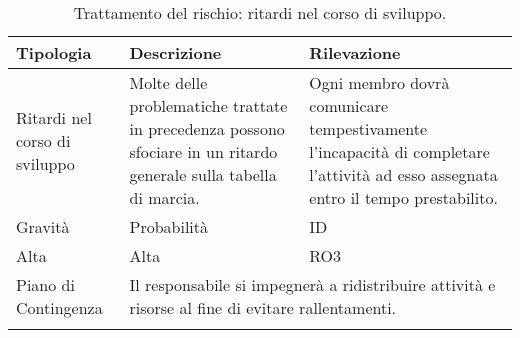 \break

\begin{center}
	\begin{longtable}{| p{5cm} | p{5cm} | p{5cm} |}
		\hline
		\rowcolor[HTML]{F9CB9C} 
		Tipologia & Descrizione & Rilevazione \\ \hline
		Ritardi nel corso di sviluppo & Molte delle problematiche trattate in precedenza possono sfociare in un ritardo generale sulla tabella di marcia. & Ogni membro dovrà comunicare tempestivamente l'incapacità di completare l'attività ad esso assegnata entro il tempo prestabilito. \\ 
		\hline
		\rowcolor[HTML]{F9CB9C} 
		Gravità & Probabilità & ID  \\ \hline
		Alta & Alta & RO3  \\ \hline
		\cellcolor[HTML]{F9CB9C} Piano di Contingenza & \multicolumn{2}{|p{10cm}|}{ Il responsabile si impegnerà a ridistribuire attività e risorse al fine di evitare rallentamenti. } \\ \hline
		\caption{Trattamento del rischio: ritardi nel corso di sviluppo.}
		\label{fig: Trattamento del rischio: ritardi nel corso di sviluppo.}
	\end{longtable}
\end{center}

\newpage